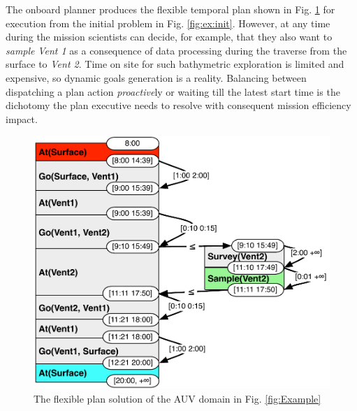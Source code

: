 The onboard planner produces the flexible temporal plan shown in
Fig. \ref{fig:ex:plan} for execution from the initial problem in
Fig. \ref{fig:ex:init}. However, at any time during the mission
scientists can decide, for example, that they also want to {\em
  sample} {\em Vent 1} as a consequence of data processing during the
traverse from the surface to {\em Vent 2}.  Time on site for such
bathymetric exploration is limited and expensive, so dynamic goals
generation is a reality.  Balancing between dispatching a plan action
\emph{proactive}ly or waiting till the latest start time is the
dichotomy the plan executive needs to resolve with consequent mission
efficiency impact.


\begin{figure}[!htb]
  \centering
  \includegraphics[width=0.8\columnwidth]{figs/example_plan}
  \caption{\small The flexible plan solution of the AUV domain in
    Fig. \ref{fig:Example}}
  \label{fig:ex:plan}
\end{figure}

